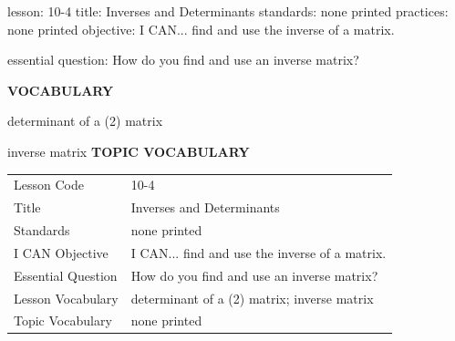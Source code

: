 \documentclass{article}
\newenvironment{lesson-meta}{}{}        %
\newcommand{\te}[1]{}                   %
\begin{document}
\begin{lesson-meta}
lesson: 10-4
title: Inverses and Determinants
standards: none printed
practices: none printed
objective: I CAN... find and use the inverse of a matrix.

essential question: How do you find and use an inverse matrix?

\textbf{VOCABULARY}
\item determinant of a (2) matrix
\item inverse matrix
\textbf{TOPIC VOCABULARY}
\te{No separate topic vocabulary list is printed on these lesson pages.}
\begin{tabular}{ll}
Lesson Code & 10-4 \\
Title & Inverses and Determinants \\
Standards & none printed \\
I CAN Objective & I CAN... find and use the inverse of a matrix. \\
Essential Question & How do you find and use an inverse matrix? \\
Lesson Vocabulary & determinant of a (2\times2) matrix; inverse matrix \\
Topic Vocabulary & none printed \\
\end{tabular}
\end{lesson-meta}
\end{document}
